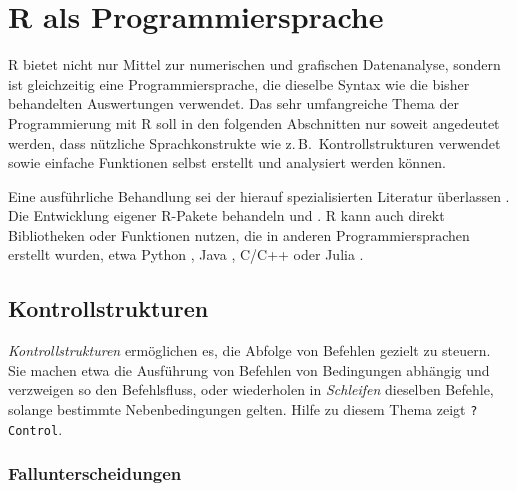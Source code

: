 \chapter{R als Programmiersprache}
\label{sec:programming}

R bietet nicht nur Mittel zur numerischen und grafischen Datenanalyse, sondern ist gleichzeitig eine Programmiersprache, die dieselbe Syntax wie die bisher behandelten Auswertungen verwendet. Das sehr umfangreiche Thema der Programmierung mit R soll in den folgenden Abschnitten nur soweit angedeutet werden, dass nützliche Sprachkonstrukte wie z.\,B.\ Kontrollstrukturen verwendet sowie einfache Funktionen selbst erstellt und analysiert werden können.

Eine ausführliche Behandlung sei der hierauf spezialisierten Literatur überlassen \cite{Chambers2008,Gillespie2017,Wickham2014a}. Die Entwicklung eigener R-Pakete behandeln  und . R kann auch direkt Bibliotheken oder Funktionen nutzen, die in anderen Programmiersprachen erstellt wurden, etwa Python \cite{Allaire2018}, Java \cite{Urbanek2018}, C/C++ \cite{Eddelbuettel2013} oder Julia \cite{Li2018}.

\section{Kontrollstrukturen}

\emph{Kontrollstrukturen} ermöglichen es, die Abfolge von Befehlen gezielt zu steuern. Sie machen etwa die Ausführung von Befehlen von Bedingungen abhängig und verzweigen so den Befehlsfluss, oder wiederholen in \emph{Schleifen} dieselben Befehle, solange bestimmte Nebenbedingungen gelten. Hilfe zu diesem Thema zeigt \lstinline!?Control!.

\subsection{Fallunterscheidungen}
\label{sec:ifElseSwitch}

